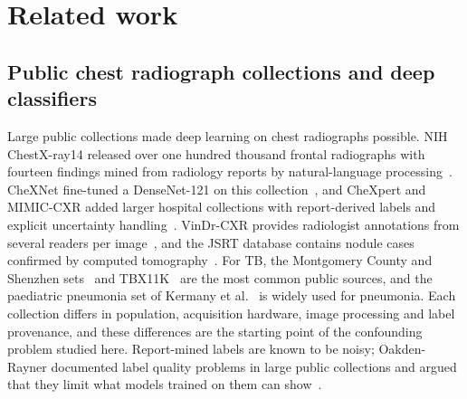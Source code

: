 \section{Related work}
\label{sec:related}

\subsection{Public chest radiograph collections and deep classifiers}
Large public collections made deep learning on chest radiographs possible. NIH ChestX-ray14 released over one hundred thousand frontal radiographs with fourteen findings mined from radiology reports by natural-language processing~\cite{wang2017chestxray8}. CheXNet fine-tuned a DenseNet-121 on this collection~\cite{rajpurkar2017chexnet}, and CheXpert and MIMIC-CXR added larger hospital collections with report-derived labels and explicit uncertainty handling~\cite{irvin2019chexpert,johnson2019mimic}. VinDr-CXR provides radiologist annotations from several readers per image~\cite{nguyen2022vindr}, and the JSRT database contains nodule cases confirmed by computed tomography~\cite{shiraishi2000development}. For TB, the Montgomery County and Shenzhen sets~\cite{jaeger2014two,candemir2014lung} and TBX11K~\cite{liu2020rethinking} are the most common public sources, and the paediatric pneumonia set of Kermany et al.~\cite{kermany2018identifying} is widely used for pneumonia. Each collection differs in population, acquisition hardware, image processing and label provenance, and these differences are the starting point of the confounding problem studied here. Report-mined labels are known to be noisy; Oakden-Rayner documented label quality problems in large public collections and argued that they limit what models trained on them can show~\cite{oakdenrayner2020exploring}.

